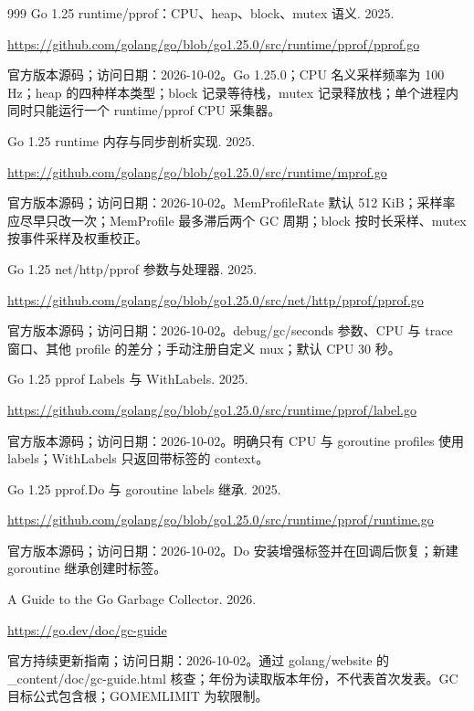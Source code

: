 \documentclass[UTF8,fontset=fandol,openany,11pt]{ctexbook}
\begin{document}
\begin{thebibliography}{999}
 Go 1.25 runtime/pprof：CPU、heap、block、mutex 语义. 2025.\par
\url{https://github.com/golang/go/blob/go1.25.0/src/runtime/pprof/pprof.go}\par
{\small 官方版本源码；访问日期：2026-10-02。Go 1.\allowbreak{}25.\allowbreak{}0；CPU 名义采样频率为 100 Hz；heap 的四种样本类型；block 记录等待栈，mutex 记录释放栈；单个进程内同时只能运行一个 runtime/\allowbreak{}pprof CPU 采集器。}

 Go 1.25 runtime 内存与同步剖析实现. 2025.\par
\url{https://github.com/golang/go/blob/go1.25.0/src/runtime/mprof.go}\par
{\small 官方版本源码；访问日期：2026-10-02。MemProfile\allowbreak{}Rate 默认 512 KiB；采样率应尽早只改一次；MemProfile 最多滞后两个 GC 周期；block 按时长采样、mutex 按事件采样及权重校正。}

 Go 1.25 net/http/pprof 参数与处理器. 2025.\par
\url{https://github.com/golang/go/blob/go1.25.0/src/net/http/pprof/pprof.go}\par
{\small 官方版本源码；访问日期：2026-10-02。debug/\allowbreak{}gc/\allowbreak{}seconds 参数、CPU 与 trace 窗口、其他 profile 的差分；手动注册自定义 mux；默认 CPU 30 秒。}

 Go 1.25 pprof Labels 与 WithLabels. 2025.\par
\url{https://github.com/golang/go/blob/go1.25.0/src/runtime/pprof/label.go}\par
{\small 官方版本源码；访问日期：2026-10-02。明确只有 CPU 与 goroutine profiles 使用 labels；WithLabels 只返回带标签的 context。}

 Go 1.25 pprof.Do 与 goroutine labels 继承. 2025.\par
\url{https://github.com/golang/go/blob/go1.25.0/src/runtime/pprof/runtime.go}\par
{\small 官方版本源码；访问日期：2026-10-02。Do 安装增强标签并在回调后恢复；新建 goroutine 继承创建时标签。}

 A Guide to the Go Garbage Collector. 2026.\par
\url{https://go.dev/doc/gc-guide}\par
{\small 官方持续更新指南；访问日期：2026-10-02。通过 golang/\allowbreak{}website 的 \_\allowbreak{}content/\allowbreak{}doc/\allowbreak{}gc-\allowbreak{}guide.\allowbreak{}html 核查；年份为读取版本年份，不代表首次发表。GC 目标公式包含根；GOMEMLIMIT 为软限制。}


\end{thebibliography}
\end{document}
